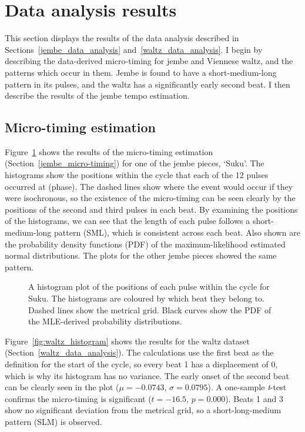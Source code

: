 \documentclass[12pt,twoside,openright]{report}
\begin{document}
\section{Data analysis results} \label{data_analysis_results}

This section displays the results of the data analysis described in Sections~\ref{jembe_data_analysis} and~\ref{waltz_data_analysis}. I
begin by describing the data-derived micro-timing for jembe and Viennese waltz,
and the patterns which occur in them. Jembe is found to have a short-medium-long
pattern in its pulses, and the waltz has a significantly early second beat. I
then describe the results of the jembe tempo estimation.


\subsection{Micro-timing estimation} \label{micro-timing_estimation_results}

Figure~\ref{fig:suku_histogram} shows the results of the micro-timing estimation (Section~\ref{jembe_micro-timing}) for one of
the jembe pieces, `Suku'. The histograms show the positions within the cycle
that each of the 12 pulses occurred at (phase). The dashed lines show where the
event would occur if they were isochronous, so the existence of the micro-timing
can be seen clearly by the positions of the second and third pulses in each beat.
By examining the positions of the histograms, we can see that the length of each pulse follows a short-medium-long pattern (SML), which is consistent across
each beat. Also shown are the probability density functions (PDF) of the
maximum-likelihood estimated normal distributions. The plots for
the other jembe pieces showed the same pattern.

\begin{figure}[ht]
    \centering
    
    \caption{A histogram plot of the positions of each pulse within the cycle for Suku. The histograms are coloured by which beat they belong to. Dashed lines show the metrical grid. Black curves show the PDF of the MLE-derived probability distributions.}
    \label{fig:suku_histogram}
\end{figure}

Figure~\ref{fig:waltz_histogram} shows the results for the waltz dataset (Section~\ref{waltz_data_analysis}). The calculations
use the first beat as the definition for the start of the cycle, so every beat 1
has a displacement of 0, which is why its histogram has no variance. The early onset
of the second beat can be clearly seen in the plot ($\mu=-0.0743$, $\sigma=0.0795$). A
one-sample \textit{t}-test confirms the micro-timing is significant ($t=-16.5$, $p=0.000$). Beats 1 and 3 show no significant deviation from the metrical grid, so a short-long-medium pattern (SLM) is observed.
\end{document}

